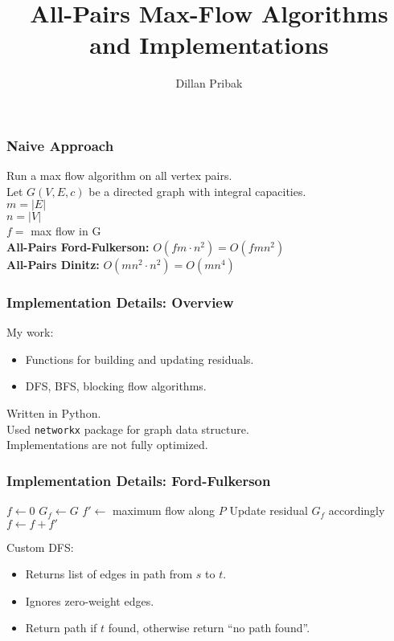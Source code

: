 \documentclass[mathserif]{beamer}
\begin{document}
\title{All-Pairs Max-Flow Algorithms and Implementations}
\author{Dillan Pribak}


\begin{frame}
\maketitle
\end{frame}

\begin{frame}
	\frametitle{Naive Approach}
	Run a max flow algorithm on all vertex pairs.\\
	Let $G(V,E,c)$ be a directed graph with integral capacities.\\
	$m = |E|$\\ 
	$n = |V|$\\
	$f=$ max flow in G\\
	\textbf{All-Pairs Ford-Fulkerson:} $O(fm\cdot n^2)= O(fmn^2)$\\
	\textbf{All-Pairs Dinitz:} $O(mn^2\cdot n^2) = O(mn^4)$
	
\end{frame}

\begin{frame}
	\frametitle{Implementation Details: Overview}
	\begin{block}{My work:}
		\begin{itemize}
			\item Functions for building and updating residuals.
			\item DFS, BFS, blocking flow algorithms.
		\end{itemize}
	\end{block}
	Written in Python.\\
	Used \texttt{networkx} package for graph data structure.\\
	Implementations are not fully optimized.

	
\end{frame}

\begin{frame}
	\frametitle{Implementation Details: Ford-Fulkerson}

	\begin{algorithmic}[1]
			\State $f \gets 0$	
			\State $G_{f} \gets G$
				\State $f' \gets$ maximum flow along $P$
				\State Update residual $G_{f}$ accordingly
				\State $f \gets f + f'$ 
	\end{algorithmic}
	\begin{block}{Custom DFS:}
		\begin{itemize}
			\item Returns list of edges in path from $s$ to $t$.\\
			\item Ignores zero-weight edges.\\
			\item Return path if $t$ found, otherwise return ``no path found''.
		\end{itemize}
	\end{block}
\end{frame}
\end{document}

